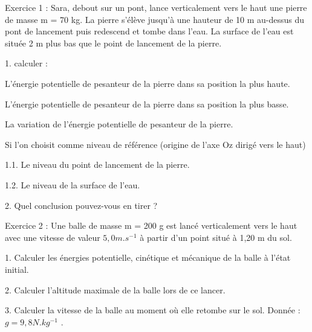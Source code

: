 \documentclass[12pt, french]{article}
\begin{document}
\begin{center}
\end{center}


\begin{Box2}{Exercice 1 : }
Sara, debout sur un pont, lance verticalement vers le haut une pierre de masse
m = 70 kg.
La pierre s’élève jusqu’à une hauteur de 10 m au-dessus du pont de lancement puis
redescend et tombe dans l’eau.
La surface de l’eau est située 2 m plus bas que le point de lancement de la pierre.

  1. calculer :

  L’énergie potentielle de pesanteur de la pierre dans sa position la plus haute.

  L’énergie potentielle de pesanteur de la pierre dans sa position la plus basse.
 
  La variation de l’énergie potentielle de pesanteur de la pierre.

  Si l’on choisit comme niveau de référence (origine de l’axe Oz dirigé vers le haut)
 
  1.1. Le niveau du point de lancement de la pierre.
 
  1.2. Le niveau de la surface de l’eau.

  2. Quel conclusion pouvez-vous en tirer ?
\end{Box2}

   \begin{Box2}{Exercice 2 : }
      Une balle de masse m = 200 g est lancé verticalement vers le haut avec une vitesse de valeur $5,0 m.s^{-1}$ à partir d'un point situé à 1,20 m du sol.

1. Calculer les énergies potentielle, cinétique et mécanique de la balle à l'état initial.

2. Calculer l'altitude maximale de la balle lors de ce lancer.

3. Calculer la vitesse de la balle au moment où elle retombe sur le sol.
      Donnée : $g = 9,8 N.kg^{-1}$ .
   \end{Box2}
\end{document}
